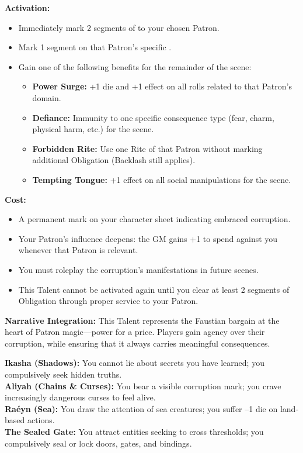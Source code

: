 \textbf{Activation:}
\begin{itemize}
    \item Immediately mark 2 segments of  to your chosen Patron.
    \item Mark 1 segment on that Patron’s specific .
    \item Gain one of the following benefits for the remainder of the scene:
    \begin{itemize}
        \item \textbf{Power Surge:} +1 die and +1 effect on all rolls related to that Patron’s domain.
        \item \textbf{Defiance:} Immunity to one specific consequence type (fear, charm, physical harm, etc.) for the scene.
        \item \textbf{Forbidden Rite:} Use one Rite of that Patron without marking additional Obligation (Backlash still applies).
        \item \textbf{Tempting Tongue:} +1 effect on all social manipulations for the scene.
    \end{itemize}
\end{itemize}

\textbf{Cost:}
\begin{itemize}
    \item A permanent mark on your character sheet indicating embraced corruption.
    \item Your Patron’s influence deepens: the GM gains +1  to spend against you whenever that Patron is relevant.
    \item You must roleplay the corruption’s manifestations in future scenes.
    \item This Talent cannot be activated again until you clear at least 2 segments of Obligation through proper service to your Patron.
\end{itemize}

\textbf{Narrative Integration:} This Talent represents the Faustian bargain at the heart of Patron magic—power for a price. Players gain agency over their corruption, while ensuring that it always carries meaningful consequences.

\begin{tcolorbox}[title=Example Corruptions by Patron]
\textbf{Ikasha (Shadows):} You cannot lie about secrets you have learned; you compulsively seek hidden truths. \\
\textbf{Aliyah (Chains \& Curses):} You bear a visible corruption mark; you crave increasingly dangerous curses to feel alive. \\
\textbf{Raéyn (Sea):} You draw the attention of sea creatures; you suffer --1 die on land-based actions. \\
\textbf{The Sealed Gate:} You attract entities seeking to cross thresholds; you compulsively seal or lock doors, gates, and bindings.
\end{tcolorbox}


